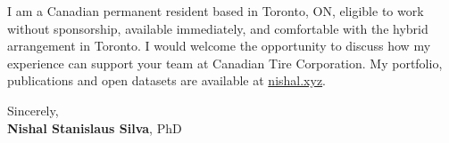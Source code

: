 \documentclass[11pt]{article}
\newcommand{\clName}{Nishal Stanislaus Silva}
\newcommand{\clCity}{Toronto, ON}
\newcommand{\clSite}{https://nishal.xyz}
\newcommand{\clCompany}{Canadian Tire Corporation}
\newcommand{\clTeam}{your team}
\begin{document}
I am a Canadian permanent resident based in \clCity{}, eligible to work without sponsorship, available immediately, and comfortable with the hybrid arrangement in Toronto. I would welcome the opportunity to discuss how my experience can support \clTeam{} at \clCompany{}. My portfolio, publications and open datasets are available at \href{\clSite}{nishal.xyz}.

\vspace{12pt}
Sincerely,\\[2pt]
\textbf{\clName}, PhD
\end{document}
